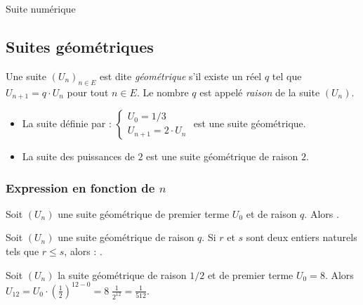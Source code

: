 \begin{chapter}{Suite num\'erique}
\subsection{Suites g\'eom\'etriques}
%
\begin{defi}
Une suite $(U_n)_{n \in E}$ est dite \emph{g\'eom\'etrique} s'il existe un r\'eel $q$ tel que $U_{n+1} = q \cdot U_n$ pour tout $n \in E$.
Le nombre $q$ est appel\'e \emph{raison} de la suite $(U_n)$.
\end{defi}
\begin{ex}
\begin{itemize} 
\item 
La suite d\'efinie par : 
$
\left\lbrace
\begin{array}{l}
U_0 = 1/3 \\
U_{n+1} = 2 \cdot U_n
\end{array}
\right.
$
est une suite g\'eom\'etrique.
\item 
La suite des puissances de $2$ est une suite g\'eom\'etrique de raison $2$.
\end{itemize}
\end{ex}
%
\subsubsection{Expression en fonction de $n$}
Soit $(U_n)$ une suite g\'eom\'etrique de premier terme $U_0$ et de raison $q$. Alors
.
\begin{prop}
Soit $(U_n)$ une suite g\'eom\'etrique de raison $q$.
Si $r$ et $s$ sont deux entiers naturels tels que $r \leq s$, alors : .
\end{prop}
%
\begin{ex}
Soit $(U_n)$ la suite g\'eom\'etrique de raison $1/2$ et de premier terme $U_0 = 8$.
Alors $U_{12} = U_0\cdot \left(\frac{1}{2}\right)^{12 - 0} = 8 \; \frac{1}{2^{12}} = \frac{1}{512}$.
\end{ex}
%

\end{chapter}
